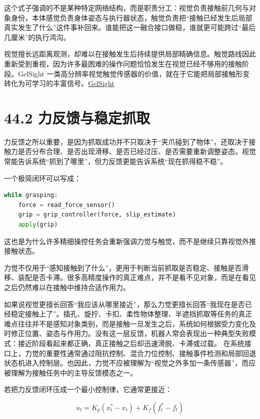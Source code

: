 这个式子强调的不是某种特定网络结构，而是职责分工：视觉负责接触前几何与对象身份，本体感觉负责身体姿态与执行器状态，触觉负责把“接触已经发生后局部真实发生了什么”这件事补回来。谁能把这一融合接口做稳，谁就更可能跨过“最后几厘米”的执行鸿沟。

视觉擅长远距离观测，却难以在接触发生后持续提供局部精确信息。触觉路线因此重新受到重视，因为许多最困难的操作问题恰恰发生在视觉已经不够用的接触阶段。GelSight 一类高分辨率视觉触觉传感器的价值，就在于它能把局部接触形变转化为可学习的丰富信号。\href{https://arxiv.org/abs/1706.09942}{GelSight}

\section*{44.2 力反馈与稳定抓取}


力反馈之所以重要，是因为抓取成功并不只取决于“夹爪碰到了物体”，还取决于接触力是否分布合理、是否出现滑移、是否已经过压、是否需要重新调整姿态。视觉常能告诉系统“抓到了哪里”，但力反馈更能告诉系统“现在抓得稳不稳”。

一个极简闭环可以写成：

\begin{lstlisting}[language=python]
while grasping:
    force = read_force_sensor()
    grip = grip_controller(force, slip_estimate)
    apply(grip)
\end{lstlisting}

这也是为什么许多精细操控任务会重新强调力觉与触觉，而不是继续只靠视觉外推接触状态。

力觉不仅用于“感知接触到了什么”，更用于判断当前抓取是否稳定、接触是否滑移、装配是否卡滞。很多高精度操作的真正难点，并不是看不见对象，而是在看见之后仍然难以在接触中维持合适作用力。

如果说视觉更擅长回答“我应该从哪里接近”，那么力觉更擅长回答“我现在是否已经稳定接触上了”。插孔、旋拧、卡扣、柔性物体整理、半遮挡抓取等任务的真正难点往往并不是感知对象类别，而是接触一旦发生之后，系统如何根据受力变化及时修正位置、姿态与作用力。没有这一层反馈，机器人常会表现出一种典型失败模式：接近阶段看起来都正确，真正接触之后却迅速滑脱、卡滞或过载。 在系统接口上，力觉的重要性通常通过阻抗控制、混合力位控制、接触事件检测和局部回退状态机进入控制层。也因此，力觉不应被理解为“视觉之外多加一条传感器”，而应被理解为接触任务中的主导反馈模态之一。

若把力反馈闭环压成一个最小控制律，它通常更接近：

\begin{equation*}
u_t = K_p(x_t^{*}-x_t) + K_f(f_t^{*}-f_t)
\end{equation*}


